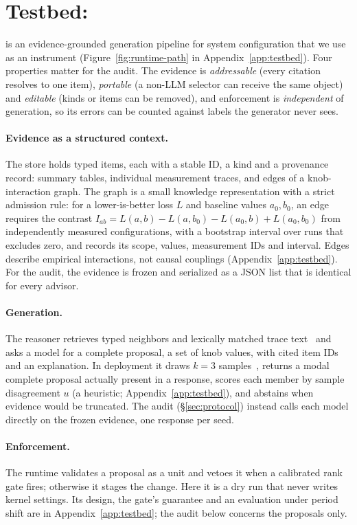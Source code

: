\section{Testbed: \sysname}
\label{sec:testbed}
\sysname is an evidence-grounded generation pipeline for system configuration that we use as an instrument (Figure~\ref{fig:runtime-path} in Appendix~\ref{app:testbed}). Four properties matter for the audit. The evidence is \emph{addressable} (every citation resolves to one item), \emph{portable} (a non-LLM selector can receive the same object) and \emph{editable} (kinds or items can be removed), and enforcement is \emph{independent} of generation, so its errors can be counted against labels the generator never sees.

\paragraph{Evidence as a structured context.}
The store holds typed items, each with a stable ID, a kind and a provenance record: summary tables, individual measurement traces, and edges of a knob-interaction graph. The graph is a small knowledge representation with a strict admission rule: for a lower-is-better loss $L$ and baseline values $a_0,b_0$, an edge requires the contrast $I_{ab}=L(a,b)-L(a,b_0)-L(a_0,b)+L(a_0,b_0)$ from independently measured configurations, with a bootstrap interval over runs that excludes zero, and records its scope, values, measurement IDs and interval. Edges describe empirical interactions, not causal couplings (Appendix~\ref{app:testbed}). For the audit, the evidence is frozen and serialized as a JSON list that is identical for every advisor.

\paragraph{Generation.}
The reasoner retrieves typed neighbors and lexically matched trace text~\cite{Lewis2020RAG} and asks a model for a complete proposal, a set of knob values, with cited item IDs and an explanation. In deployment it draws $k=3$ samples~\cite{Wang2023SelfConsistency}, returns a modal complete proposal actually present in a response, scores each member by sample disagreement $u$ (a heuristic; Appendix~\ref{app:testbed}), and abstains when evidence would be truncated. The audit (\S\ref{sec:protocol}) instead calls each model directly on the frozen evidence, one response per seed.

\paragraph{Enforcement.}
The runtime validates a proposal as a unit and vetoes it when a calibrated rank gate fires; otherwise it stages the change. Here it is a dry run that never writes kernel settings. Its design, the gate's guarantee and an evaluation under period shift are in Appendix~\ref{app:testbed}; the audit below concerns the proposals only.
